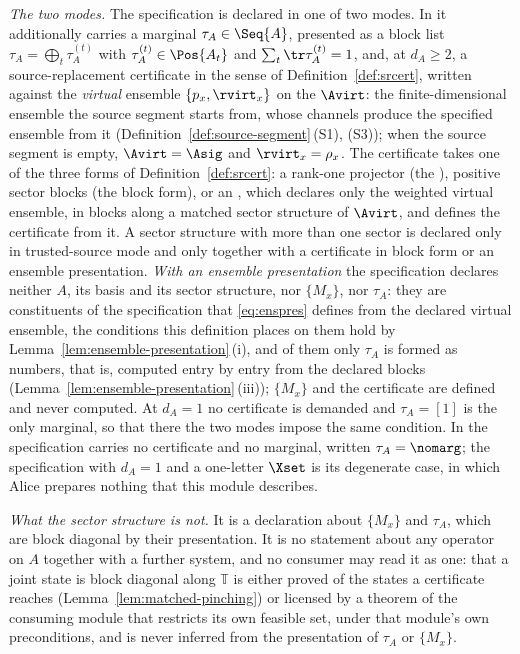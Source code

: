 \begin{definition}
\emph{The two modes.} The specification is declared in one of two modes. In
 it additionally carries a marginal
$\tau_A\in\Seq{A}$, presented as a block list
$\tau_A=\bigoplus_t\tau^{(t)}_A$ with $\tau^{(t)}_A\in\Pos{A_t}$ and
$\sum_t\tr\tau^{(t)}_A=1$, and, at $d_A\ge2$, a source-replacement
certificate in the sense of Definition~\ref{def:srcert}, written against the
\emph{virtual} ensemble $\{p_x,\rvirt_x\}$ on the 
$\Avirt$: the finite-dimensional ensemble the source segment starts from, whose
channels produce the specified ensemble from it
(Definition~\ref{def:source-segment}\,(S1), (S3)); when the source segment is
empty, $\Avirt=\Asig$ and $\rvirt_x=\rho_x$. The certificate takes one of the
three forms of Definition~\ref{def:srcert}: a rank-one projector (the ), positive sector blocks (the block form), or an ,
which declares only the weighted virtual ensemble, in blocks along a matched
sector structure of $\Avirt$, and defines the certificate from it. A sector structure with more than one sector is declared only in
trusted-source mode and only together with a certificate in block form or an
ensemble presentation. \emph{With an ensemble presentation} the specification
declares neither $A$, its basis and its sector structure, nor $\{M_x\}$, nor
$\tau_A$: they are constituents of the specification that \eqref{eq:enspres}
defines from the declared virtual ensemble, the conditions this definition
places on them hold by Lemma~\ref{lem:ensemble-presentation}\,(i), and of
them only $\tau_A$ is formed as numbers, that is, computed entry by entry from
the declared blocks (Lemma~\ref{lem:ensemble-presentation}\,(iii));
$\{M_x\}$ and the certificate are defined and never computed. At $d_A=1$ no
certificate is demanded and $\tau_A=[1]$ is the only marginal, so that there
the two modes impose the same condition. In
 the specification carries no certificate and no
marginal, written
$\tau_A=\nomarg$; the specification with
$d_A=1$ and a one-letter $\Xset$ is its degenerate case, in which Alice
prepares nothing that this module describes.

\emph{What the sector structure is not.} It is a declaration about
$\{M_x\}$ and $\tau_A$, which are block diagonal by their presentation. It
is no statement about any operator on $A$ together with a further system,
and no consumer may read it as one: that a joint state is block diagonal
along $\mathbb{T}$ is either proved of the states a certificate reaches
(Lemma~\ref{lem:matched-pinching}) or licensed by a theorem of the consuming
module that restricts its own feasible set, under that module's own
preconditions, and is never inferred from the presentation of $\tau_A$ or
$\{M_x\}$.


\end{definition}
